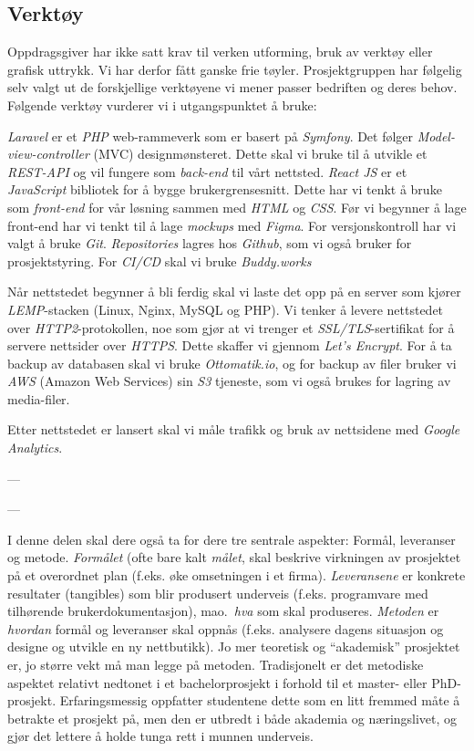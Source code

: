 \documentclass[11pt,a4paper]{report}
\begin{document}
\subsection*{Verktøy}

Oppdragsgiver har ikke satt krav til verken utforming, bruk av verktøy eller grafisk uttrykk. Vi har derfor fått ganske frie tøyler. Prosjektgruppen har følgelig selv valgt ut de forskjellige verktøyene vi mener passer bedriften og deres behov. Følgende verktøy vurderer vi i utgangspunktet å bruke:

\textit{Laravel} er et \textit{PHP} web-rammeverk som er basert på \textit{Symfony}. Det følger \textit{Model-view-controller} (MVC) designmønsteret. Dette skal vi bruke til å utvikle et \textit{REST-API} og vil fungere som \textit{back-end} til vårt nettsted.
\textit{React JS} er et \textit{JavaScript} bibliotek for å bygge brukergrensesnitt. Dette har vi tenkt å bruke som \textit{front-end} for vår løsning sammen med \textit{HTML} og \textit{CSS}. Før vi begynner å lage front-end har vi tenkt til å lage \textit{mockups} med \textit{Figma}.
For versjonskontroll har vi valgt å bruke \textit{Git}.
\textit{Repositories} lagres hos \textit{Github}, som vi også bruker for prosjektstyring. For  \textit{CI/CD} skal vi bruke \textit{Buddy.works}

Når nettstedet begynner å bli ferdig skal vi laste det opp på en server som kjører \textit{LEMP}-stacken (Linux, Nginx, MySQL og PHP). Vi tenker å levere nettstedet over \textit{HTTP2}-protokollen, noe som gjør at vi trenger et \textit{SSL/TLS}-sertifikat for å servere nettsider over \textit{HTTPS}. Dette skaffer vi gjennom \textit{Let's Encrypt}. For å ta backup av databasen skal vi bruke \textit{Ottomatik.io}, og for backup av filer bruker vi \textit{AWS} (Amazon Web Services) sin \textit{S3} tjeneste, som vi også brukes for lagring av media-filer.

Etter nettstedet er lansert skal vi måle trafikk og bruk av nettsidene med \textit{Google Analytics}.

---






---

I denne delen skal dere også ta for dere  tre sentrale aspekter: Formål, leveranser og metode. {\em Formålet} (ofte bare kalt {\em målet}, skal beskrive virkningen av prosjektet på et overordnet plan (f.eks. øke omsetningen i et firma). 
{\em Leveransene} er konkrete resultater (tangibles) som blir produsert underveis (f.eks. programvare med tilhørende brukerdokumentasjon), mao.\ {\em hva} som skal produseres. 
{\em Metoden} er {\em hvordan} formål og leveranser skal oppnås (f.eks. analysere dagens situasjon og designe og utvikle en ny nettbutikk). 
Jo mer teoretisk og ``akademisk'' prosjektet er, jo større vekt må man legge på metoden. Tradisjonelt er det metodiske aspektet relativt nedtonet i et bachelorprosjekt i forhold til et master- eller PhD-prosjekt.
Erfaringsmessig oppfatter studentene dette som en litt fremmed måte å betrakte et prosjekt på, men den er utbredt i både akademia og næringslivet, og gjør det lettere å holde tunga rett i munnen underveis. 
\end{document}
